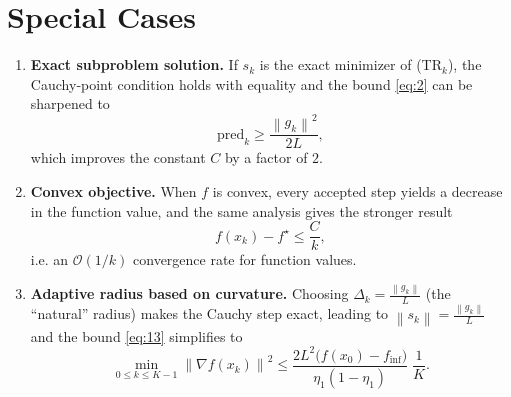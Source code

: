 \documentclass{article}
\newcommand{\norm}[1]{\left\lVert #1 \right\rVert}
\begin{document}
\section*{Special Cases}
\begin{enumerate}[label=\alph*)]
\item \textbf{Exact subproblem solution.}  
If $s_k$ is the exact minimizer of (TR$_k$), the Cauchy‑point condition holds with equality and the bound \eqref{eq:2} can be sharpened to
\[
\text{pred}_k \ge \frac{\norm{g_k}^2}{2L},
\]
which improves the constant $C$ by a factor of $2$.

\item \textbf{Convex objective.}  
When $f$ is convex, every accepted step yields a decrease in the function value, and the same analysis gives the stronger result
\[
f(x_k)-f^\star \le \frac{C}{k},
\]
i.e. an $\mathcal{O}(1/k)$ convergence rate for function values.

\item \textbf{Adaptive radius based on curvature.}  
Choosing $\Delta_k = \frac{\norm{g_k}}{L}$ (the “natural” radius) makes the Cauchy step exact, leading to $\norm{s_k}= \frac{\norm{g_k}}{L}$ and the bound \eqref{eq:13} simplifies to
\[
\min_{0\le k\le K-1}\norm{\nabla f(x_k)}^2 \le \frac{2L^2\bigl(f(x_0)-f_{\inf}\bigr)}{\eta_1(1-\eta_1)}\;\frac{1}{K}.
\]

\end{enumerate}
\end{document}
